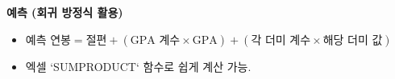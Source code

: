 \documentclass[11pt,a4paper]{article}
\begin{document}
\begin{tcolorbox}[summary={핵심 요약: 다중 범주 더미 변수}]
\textbf{예측 (회귀 방정식 활용)}
\begin{itemize}
    \item $\text{예측 연봉} = \text{절편} + (\text{GPA 계수} \times \text{GPA}) + (\text{각 더미 계수} \times \text{해당 더미 값})$
    \item 엑셀 `SUMPRODUCT` 함수로 쉽게 계산 가능.
\end{itemize}
\end{tcolorbox}
\end{document}
